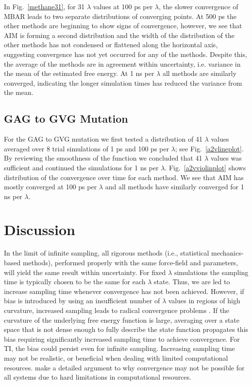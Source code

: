 \documentclass[fleqn,10pt,lineno]{wlpeerj} %
\begin{document}
In Fig.\ \ref{methane31}, for 31 $\lambda$ values at 100 ps per $\lambda$, the slower convergence of MBAR leads to two separate distributions of converging points. At 500 ps the other methods are beginning to show signs of convergence, however, we see that AIM is forming a second distribution and the width of the distribution of the other methods has not condensed or flattened along the horizontal axis, suggesting convergence has not yet occurred for any of the methods. Despite this, the average of the methods are in agreement within uncertainty, i.e. variance in the mean of the estimated free energy. At 1 ns per $\lambda$ all methods are similarly converged, indicating the longer simulation times has reduced the variance from the mean. 

\subsection*{GAG to GVG Mutation} \label{res:gxg}

For the GAG to GVG mutation we first tested a distribution of 41 $\lambda$ values averaged over 8 trial simulations of 1 ps and 100 ps per $\lambda$; see Fig.\ \ref{a2vlineplot}. By reviewing the smoothness of the function we concluded that 41 $\lambda$ values was sufficient and continued the simulations for 1 ns per $\lambda$. Fig.\ \ref{a2vviolinplot} shows distribution of the convergence over time for each method. We see that AIM has mostly converged at 100 ps per $\lambda$ and all methods have similarly converged for 1 ns per $\lambda$.

\section*{Discussion} \label{discussion}

In the limit of infinite sampling, all rigorous methods (i.e., statistical mechanics-based methods), performed properly with the same force-field and parameters, will yield the same result within uncertainty. For fixed $\lambda$ simulations the sampling time is typically chosen to be the same for each $\lambda$ state. Thus, we are led to increase sampling time whenever convergence has not been achieved. However, if bias is introduced by using an insufficient number of $\lambda$ values in regions of high curvature, increased sampling leads to radical convergence problems \citep{Shyu2009, SteinBrecher2010}. If the curvature of the underlying free energy function is large, averaging over a state space that is not dense enough to fully describe the state function propagates this bias requiring significantly increased sampling time to achieve convergence. For TI, the bias could persist even for infinite sampling. Increasing sampling time may not be realistic, or beneficial when dealing with limited computational resources. \cite{Paliwal2011} make a detailed argument to why convergence may not be possible for all systems due to hard limitations in computational resources. 
\end{document}
